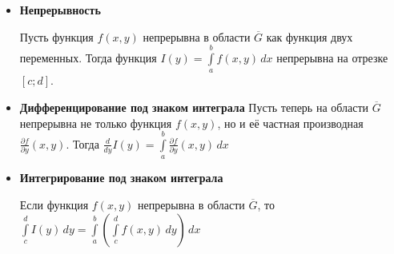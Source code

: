 \begin{itemize}
    \item \textbf{Непрерывность} 

    Пусть функция ${\displaystyle f(x,y)}$ непрерывна в области 
    ${\displaystyle {\overline {G}}}$ как функция двух переменных. 
    Тогда функция ${\displaystyle I\left(y\right)=\int \limits _{a}^{b}f\left(x,y\right)\,dx}$ 
    непрерывна на отрезке ${\displaystyle [c;d]}$.

    \item \textbf{Дифференцирование под знаком интеграла}
    Пусть теперь на области ${\displaystyle {\overline {G}}}$ 
    непрерывна не только функция ${\displaystyle f(x,y)}$, 
    но и её частная производная ${\displaystyle {\frac {\partial f}{\partial y}}\left(x,y\right)}$.
    Тогда ${\displaystyle {\frac {d}{dy}}I(y)=\int \limits _{a}^{b}{\frac {\partial f}{\partial y}}\left(x,y\right)\,dx}$

    \item \textbf{Интегрирование под знаком интеграла}

    Если функция ${\displaystyle f(x,y)}$ непрерывна в области ${\displaystyle {\overline {G}}}$, то
    ${\displaystyle \int \limits _{c}^{d}I(y)\,dy=\int \limits _{a}^{b}\left(\int \limits _{c}^{d}f(x,y)\,dy\right)\,dx}$
\end{itemize}